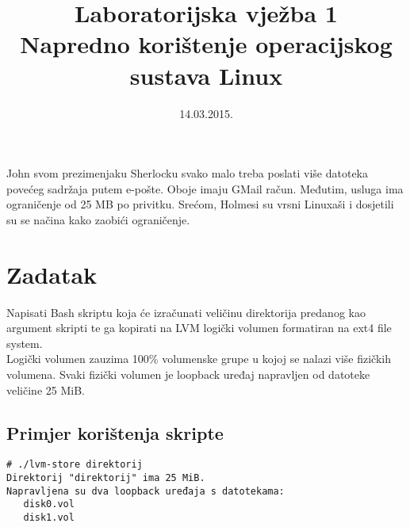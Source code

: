 \documentclass[12pt,a4paper]{article}
\begin{document}
	\title{Laboratorijska vježba 1\\{\large Napredno korištenje operacijskog sustava Linux}}
	\date{\vspace{-5ex} 14.03.2015.}
	\maketitle
	John svom prezimenjaku Sherlocku svako malo treba poslati više datoteka povećeg sadržaja putem e-pošte. Oboje imaju GMail račun. Međutim, usluga ima ograničenje od 25 MB po privitku. Srećom, Holmesi su vrsni Linuxaši i dosjetili su se načina kako zaobići ograničenje.
	
	\section*{Zadatak}
	Napisati Bash skriptu koja će izračunati veličinu direktorija predanog kao argument skripti te ga kopirati na LVM logički volumen formatiran na ext4 file system.\\
	Logički volumen zauzima 100\% volumenske grupe u kojoj se nalazi više fizičkih volumena. Svaki fizički volumen je loopback uređaj napravljen od datoteke veličine 25 MiB.\\
	
	\subsection*{Primjer korištenja skripte}
	\begin{verbatim}
# ./lvm-store direktorij
Direktorij "direktorij" ima 25 MiB.
Napravljena su dva loopback uređaja s datotekama:
   disk0.vol
   disk1.vol
	\end{verbatim}	
\end{document}
